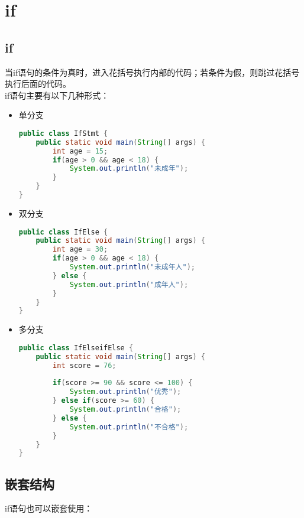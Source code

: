 \newpage

\section{if}

\subsection{if}

当if语句的条件为真时，进入花括号执行内部的代码；若条件为假，则跳过花括号执行后面的代码。 \\

if语句主要有以下几种形式：

\begin{itemize}
	\item 单分支
	      \vspace{-0.5cm}
	      \begin{lstlisting}[language=Java]
public class IfStmt {
	public static void main(String[] args) {
		int age = 15;
		if(age > 0 && age < 18) {
			System.out.println("未成年");
		}
	}
}
\end{lstlisting}

	\item 双分支
	      \vspace{-0.5cm}
	      \begin{lstlisting}[language=Java]
public class IfElse {
	public static void main(String[] args) {
		int age = 30;
		if(age > 0 && age < 18) {
			System.out.println("未成年人");
		} else {
			System.out.println("成年人");
		}
	}
}
\end{lstlisting}

	\item 多分支
	      \vspace{-0.5cm}
	      \begin{lstlisting}[language=Java]
public class IfElseifElse {
	public static void main(String[] args) {
		int score = 76;
			
		if(score >= 90 && score <= 100) {
			System.out.println("优秀");
		} else if(score >= 60) {
			System.out.println("合格");
		} else {
			System.out.println("不合格");
		}
	}
}
\end{lstlisting}
\end{itemize}

\subsection{嵌套结构}

if语句也可以嵌套使用：

